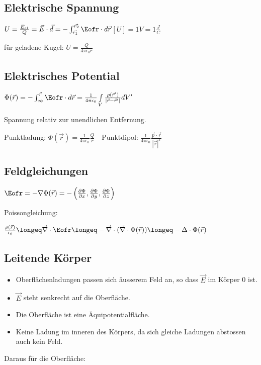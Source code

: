 \documentclass[10pt,a4paper]{scrartcl}
\begin{document}
\begin{multicols*}{3}
	\subsection{Elektrische Spannung}
	
	$U = \frac{E_{el}}{Q}=\vec{E}\cdot\vec{d}=-\int_{\vec{r_1}}^{\vec{r_2}}
	{\Eofr\cdot d \vec{r}}$\hfill$[U]=1V=1\frac{J}{C}$
	
	für geladene Kugel: $U=\frac{Q}{4\pi\epsilon_0 r}$
	
	\subsection{Elektrisches Potential}
	
	$ \Phi (\vec{r})=-\int_{\infty}^{\vec{r}}{\Eofr\cdot d \vec{r}}=\frac{1}{4\pi\epsilon_0}\int\limits_V\frac{\rho(\vec{r}')}{|\vec{r}-\vec{r}'|}dV'$
	
	Spannung relativ zur unendlichen Entfernung.

	Punktladung: $\Phi(\vec{r})=\frac{1}{4\pi\epsilon_0}\frac{Q}{r}\quad$Punktdipol: $\frac{1}{4\pi\epsilon_0}\frac{\vec{p}\cdot\vec{r}}{|\vec{r}|^3}$
	
	\subsection{Feldgleichungen}
	
	$\Eofr=-\nabla\Phi(\vec{r})=-\left(\frac{\partial\Phi}{\partial x},\frac{\partial\Phi}{\partial y},\frac{\partial\Phi}{\partial z}\right)$
	
	Poissongleichung:
	
	$\frac{\rho(\vec{r})}{\epsilon_0} \longeq \vec{\nabla}\cdot\Eofr \longeq -\vec{\nabla}\cdot(\vec{\nabla}\cdot\Phi(\vec{r})) \longeq
	-\Delta\cdot\Phi(\vec{r})$
	
	\subsection{Leitende Körper}
	
		\begin{itemize}
			\compaq
			\item Oberflächenladungen passen sich äusserem Feld an, so dass $\vec{E}$ im Körper 0 ist.
			\item $\vec{E}$ steht senkrecht auf die Oberfläche.
			\item Die Oberfläche ist eine Äquipotentialfläche.
			\item Keine Ladung im inneren des Körpers, da sich gleiche Ladungen abstossen \dahe auch kein Feld.
		\end{itemize}
		Daraus für die Oberfläche:
		

\end{multicols*}
\end{document}
